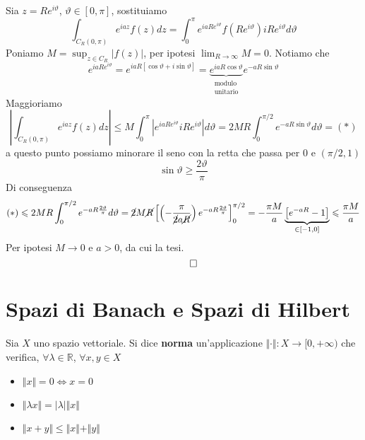 Sia $z=Re^{i\vartheta }$, $\vartheta \in [ 0,\pi ]$, sostituiamo
\begin{equation*}
\int _{C_{R} (0,\pi )} e^{iaz} f(z)dz=\int ^{\pi }_{0} e^{iaRe^{i\vartheta }} f\left( Re^{i\vartheta }\right) iRe^{i\vartheta } d\vartheta 
\end{equation*}
Poniamo $M=\sup _{z\in C_{R}}| f( z)| $, per ipotesi $\lim _{R\rightarrow \infty } M=0$. Notiamo che
\begin{equation*}
e^{iaRe^{i\vartheta }} =e^{iaR[\cos \vartheta +i\sin \vartheta ]} =\underbrace{e^{iaR\cos \vartheta }}_{\substack{\text{modulo}\\\text{unitario}}} e^{-aR\sin \vartheta }
\end{equation*}
Maggioriamo
\begin{equation*}
\left| \int _{C_{R} (0,\pi )} e^{iaz} f(z)dz\right| \leqslant M\int ^{\pi }_{0}\left| e^{iaRe^{i\vartheta }} iRe^{i\vartheta }\right| d\vartheta =2MR\int ^{\pi /2}_{0} e^{-aR\sin \vartheta } d\vartheta =( *)
\end{equation*}
a questo punto possiamo minorare il seno con la retta che passa per $0$ e $( \pi /2,1)$
\begin{equation*}
\sin \vartheta \geqslant \frac{2\vartheta }{\pi }
\end{equation*}
Di conseguenza
\begin{equation*}
( *) \leqslant 2MR\int ^{\pi /2}_{0} e^{-aR\frac{2\vartheta }{\pi }} d\vartheta =\cancel{2} M\cancel{R}\left[\left( -\frac{\pi }{\cancel{2} a\cancel{R}}\right) e^{-aR\frac{2\vartheta }{\pi }}\right]^{\pi /2}_{0} =-\frac{\pi M}{a}\underbrace{\left[ e^{-aR} -1\right]}_{\in [ -1,0]} \leqslant \frac{\pi M}{a}
\end{equation*}
Per ipotesi $M\rightarrow 0$ e $a >0$, da cui la tesi.
\begin{equation*}
\qed 
\end{equation*}



\chapter{Spazi di Banach e Spazi di Hilbert}
\begin{defn}
[Norma] Sia $X$ uno spazio vettoriale. Si dice \textbf{norma} un'applicazione $\Vert \cdotp \Vert :X\rightarrow [ 0,+\infty )$ che verifica, $\forall \lambda \in \mathbb{R}$, $\forall x,y\in X$
\begin{itemize}
\item $\Vert x\Vert =0\Leftrightarrow x=0$
\item $\Vert \lambda x\Vert =| \lambda | \Vert x\Vert $
\item $\Vert x+y\Vert \leqslant \Vert x\Vert +\Vert y\Vert $
\end{itemize}
\end{defn}

